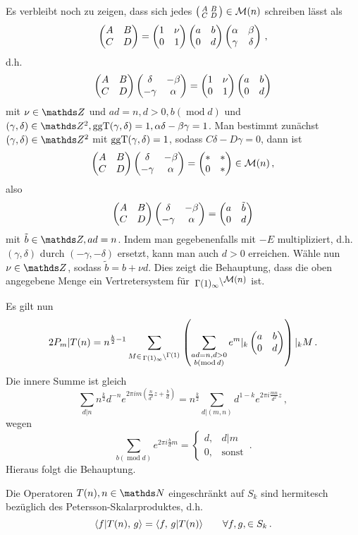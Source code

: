 \begin{bewe}
Es verbleibt noch zu zeigen, dass sich jedes $\mymat ABCD \in \mathcal M (n)$ schreiben lässt als
\[
	\mymat* ABCD = \mymat* 1\nu 01 \mymat* ab0d \mymat* \alpha \beta \gamma \delta
	\,,
\]
d.h. 
\[
	\mymat* ABCD \mymat* \delta{-\beta}{-\gamma}\alpha = \mymat* 1\nu 01 \mymat* ab0d
\]
mit $\nu \in \ZZ$ und $ad = n, d > 0, b (\operatorname{mod} d)$ und $(\gamma, \delta) \in \ZZ^2, \ggt(\gamma, \delta) = 1, \alpha\delta - \beta\gamma = 1$. Man bestimmt zunächst $(\gamma, \delta) \in \ZZ^2$ mit $\operatorname{ggT}(\gamma, \delta) = 1$, sodass $C\delta - D\gamma = 0$, dann ist
\[
	\mymat* ABCD \mymat* \delta{-\beta}{-\gamma}\alpha = \mymat* {*}{*}0{*} \in \mathcal M(n)
	\,,
\]
also
\[
	\mymat* ABCD \mymat* \delta{-\beta}{-\gamma}\alpha = \mymat* a{\tilde b}0d 
\]
mit $\tilde b \in \ZZ, ad = n$. Indem man gegebenenfalls mit $-E$ multipliziert, d.h. $(\gamma, \delta)$ durch $(-\gamma, -\delta)$ ersetzt, kann man auch $d > 0$ erreichen. Wähle nun $\nu \in \ZZ$, sodass $\tilde b = b + \nu d$. Dies zeigt die Behauptung, dass die oben angegebene Menge ein Vertretersystem für $\linksmodulo{\Gamma(1)_\infty}{\mathcal{M}(n)}$ ist.

Es gilt nun
\[
	2 P_m | T(n) = n^{\frac k2 - 1} \sum_{M \in \linksmodulo {\Gamma(1)_\infty}{\Gamma(1)}} \left( \sum_{\substack{ad = n, d > 0 \\ b (\operatorname{mod} d)}} e^m |_k \mymat* ab0d \right) |_k M
	\,.
\]
Die innere Summe ist gleich 
\[
	\sum_{d|n} n^{\frac k2} d^{-n} e^{2\pi im \left( \frac {n}{d^2} z + \frac bd \right)} = n^{\frac k2} \sum_{d | (m,n)} d^{1-k} e^{2\pi i \frac {mn}{d^2} z}
	\,,
\]
wegen 
\[
	\sum_{b (\operatorname{mod} d)} e^{2\pi i \frac bd m} = \begin{cases} d, &d|m \\ 0, &\text{sonst}\end{cases}
	\,.
\]
Hieraus folgt die Behauptung.
\end{bewe}

\begin{satz}\label{T(n)herm}
Die Operatoren $T(n), n \in \NN$ eingeschränkt auf $S_k$ sind hermitesch bezüglich des Petersson-Skalarproduktes, d.h.
\[
	\scalarprd {f|T(n)}g = \scalarprd f{g|T(n)} \qquad \forall f,g, \in S_k
	\,.
\]
\end{satz}

